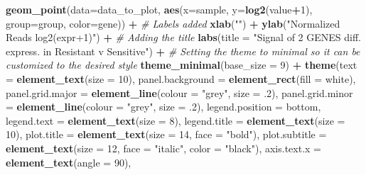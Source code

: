 \documentclass[
]{article}
\newenvironment{Shaded}{\begin{snugshade}}{\end{snugshade}}
\newcommand{\AttributeTok}[1]{\textcolor[rgb]{0.13,0.29,0.53}{#1}}
\newcommand{\CommentTok}[1]{\textcolor[rgb]{0.56,0.35,0.01}{\textit{#1}}}
\newcommand{\DecValTok}[1]{\textcolor[rgb]{0.00,0.00,0.81}{#1}}
\newcommand{\FunctionTok}[1]{\textcolor[rgb]{0.13,0.29,0.53}{\textbf{#1}}}
\newcommand{\NormalTok}[1]{#1}
\newcommand{\SpecialCharTok}[1]{\textcolor[rgb]{0.81,0.36,0.00}{\textbf{#1}}}
\newcommand{\StringTok}[1]{\textcolor[rgb]{0.31,0.60,0.02}{#1}}
\begin{document}
\begin{Shaded}
\begin{Highlighting}[]
  \FunctionTok{geom\_point}\NormalTok{(}\AttributeTok{data=}\NormalTok{data\_to\_plot, }\FunctionTok{aes}\NormalTok{(}\AttributeTok{x=}\NormalTok{sample, }\AttributeTok{y=}\FunctionTok{log2}\NormalTok{(value}\SpecialCharTok{+}\DecValTok{1}\NormalTok{), }\AttributeTok{group=}\NormalTok{group, }\AttributeTok{color=}\NormalTok{gene)) }\SpecialCharTok{+}
  \CommentTok{\# Labels added}
  \FunctionTok{xlab}\NormalTok{(}\StringTok{""}\NormalTok{) }\SpecialCharTok{+}
  \FunctionTok{ylab}\NormalTok{(}\StringTok{"Normalized Reads log2(expr+1)"}\NormalTok{) }\SpecialCharTok{+}
  \CommentTok{\# Adding the title}
  \FunctionTok{labs}\NormalTok{(}\AttributeTok{title =} \StringTok{"Signal of 2 GENES diff. express. in Resistant v Sensitive"}\NormalTok{) }\SpecialCharTok{+}
  \CommentTok{\# Setting the theme to minimal so it can be customized to the desired style}
  \FunctionTok{theme\_minimal}\NormalTok{(}\AttributeTok{base\_size =} \DecValTok{9}\NormalTok{) }\SpecialCharTok{+}
  \FunctionTok{theme}\NormalTok{(}\AttributeTok{text             =} \FunctionTok{element\_text}\NormalTok{(}\AttributeTok{size =} \DecValTok{10}\NormalTok{),}
        \AttributeTok{panel.background =} \FunctionTok{element\_rect}\NormalTok{(}\AttributeTok{fill =} \StringTok{\textquotesingle{}white\textquotesingle{}}\NormalTok{),}
        \AttributeTok{panel.grid.major =} \FunctionTok{element\_line}\NormalTok{(}\AttributeTok{colour =} \StringTok{"grey"}\NormalTok{, }\AttributeTok{size =}\NormalTok{ .}\DecValTok{2}\NormalTok{),}
        \AttributeTok{panel.grid.minor =} \FunctionTok{element\_line}\NormalTok{(}\AttributeTok{colour =} \StringTok{"grey"}\NormalTok{, }\AttributeTok{size =}\NormalTok{ .}\DecValTok{2}\NormalTok{),}
        \AttributeTok{legend.position  =} \StringTok{\textquotesingle{}bottom\textquotesingle{}}\NormalTok{,}
        \AttributeTok{legend.text      =} \FunctionTok{element\_text}\NormalTok{(}\AttributeTok{size =} \DecValTok{8}\NormalTok{),}
        \AttributeTok{legend.title     =} \FunctionTok{element\_text}\NormalTok{(}\AttributeTok{size =} \DecValTok{10}\NormalTok{),}
        \AttributeTok{plot.title       =} \FunctionTok{element\_text}\NormalTok{(}\AttributeTok{size =} \DecValTok{14}\NormalTok{, }\AttributeTok{face =} \StringTok{"bold"}\NormalTok{),}
        \AttributeTok{plot.subtitle    =} \FunctionTok{element\_text}\NormalTok{(}\AttributeTok{size =} \DecValTok{12}\NormalTok{, }\AttributeTok{face =} \StringTok{"italic"}\NormalTok{, }\AttributeTok{color =} \StringTok{"black"}\NormalTok{),}
        \AttributeTok{axis.text.x      =} \FunctionTok{element\_text}\NormalTok{(}\AttributeTok{angle =} \DecValTok{90}\NormalTok{),}

\end{Highlighting}
\end{Shaded}
\end{document}
